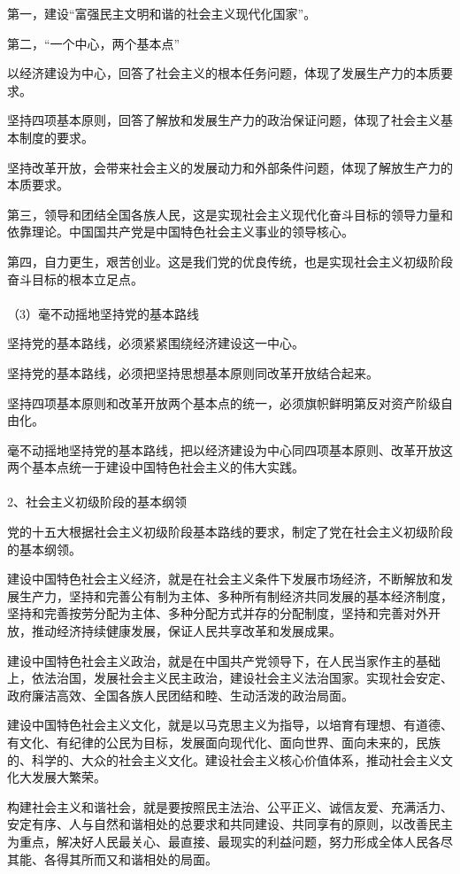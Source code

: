 \documentclass{ctexart}
\begin{document}
第一，建设“富强民主文明和谐的社会主义现代化国家”。

第二，“一个中心，两个基本点”

以经济建设为中心，回答了社会主义的根本任务问题，体现了发展生产力的本质要求。

坚持四项基本原则，回答了解放和发展生产力的政治保证问题，体现了社会主义基本制度的要求。

坚持改革开放，会带来社会主义的发展动力和外部条件问题，体现了解放生产力的本质要求。

第三，领导和团结全国各族人民，这是实现社会主义现代化奋斗目标的领导力量和依靠理论。中国国共产党是中国特色社会主义事业的领导核心。

第四，自力更生，艰苦创业。这是我们党的优良传统，也是实现社会主义初级阶段奋斗目标的根本立足点。
\\\\

（3）毫不动摇地坚持党的基本路线

坚持党的基本路线，必须紧紧围绕经济建设这一中心。

坚持党的基本路线，必须把坚持思想基本原则同改革开放结合起来。

坚持四项基本原则和改革开放两个基本点的统一，必须旗帜鲜明第反对资产阶级自由化。

毫不动摇地坚持党的基本路线，把以经济建设为中心同四项基本原则、改革开放这两个基本点统一于建设中国特色社会主义的伟大实践。
\\\\

2、社会主义初级阶段的基本纲领

党的十五大根据社会主义初级阶段基本路线的要求，制定了党在社会主义初级阶段的基本纲领。

建设中国特色社会主义经济，就是在社会主义条件下发展市场经济，不断解放和发展生产力，坚持和完善公有制为主体、多种所有制经济共同发展的基本经济制度，坚持和完善按劳分配为主体、多种分配方式并存的分配制度，坚持和完善对外开放，推动经济持续健康发展，保证人民共享改革和发展成果。

建设中国特色社会主义政治，就是在中国共产党领导下，在人民当家作主的基础上，依法治国，发展社会主义民主政治，建设社会主义法治国家。实现社会安定、政府廉洁高效、全国各族人民团结和睦、生动活泼的政治局面。

建设中国特色社会主义文化，就是以马克思主义为指导，以培育有理想、有道德、有文化、有纪律的公民为目标，发展面向现代化、面向世界、面向未来的，民族的、科学的、大众的社会主义文化。建设社会主义核心价值体系，推动社会主义文化大发展大繁荣。

构建社会主义和谐社会，就是要按照民主法治、公平正义、诚信友爱、充满活力、安定有序、人与自然和谐相处的总要求和共同建设、共同享有的原则，以改善民主为重点，解决好人民最关心、最直接、最现实的利益问题，努力形成全体人民各尽其能、各得其所而又和谐相处的局面。
\end{document}
